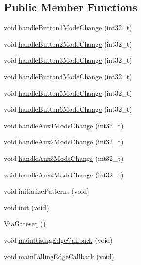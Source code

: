 \subsection*{Public Member Functions}
\begin{DoxyCompactItemize}
\item 
void \mbox{\hyperlink{class_via_gateseq_a7238ac41564eee6827e6a01032374a4f}{handle\+Button1\+Mode\+Change}} (int32\+\_\+t)
\item 
void \mbox{\hyperlink{class_via_gateseq_ab28f41fb2ac733e2e027164400bbe868}{handle\+Button2\+Mode\+Change}} (int32\+\_\+t)
\item 
void \mbox{\hyperlink{class_via_gateseq_a87d499976eda6b518b32b240692ee83b}{handle\+Button3\+Mode\+Change}} (int32\+\_\+t)
\item 
void \mbox{\hyperlink{class_via_gateseq_a4fd21cfbe89e9a610a4f1fed5a3a5209}{handle\+Button4\+Mode\+Change}} (int32\+\_\+t)
\item 
void \mbox{\hyperlink{class_via_gateseq_abe42605edbcd7826d040303dd4564eeb}{handle\+Button5\+Mode\+Change}} (int32\+\_\+t)
\item 
void \mbox{\hyperlink{class_via_gateseq_ace1960408caf61b994b099151c663580}{handle\+Button6\+Mode\+Change}} (int32\+\_\+t)
\item 
void \mbox{\hyperlink{class_via_gateseq_a1eb52cddac4eee6df5044e712ff679aa}{handle\+Aux1\+Mode\+Change}} (int32\+\_\+t)
\item 
void \mbox{\hyperlink{class_via_gateseq_a73ae14c3b94bf0440f823f81ee11fd95}{handle\+Aux2\+Mode\+Change}} (int32\+\_\+t)
\item 
void \mbox{\hyperlink{class_via_gateseq_a65dbb600b9d299c8e2792f9deee742b5}{handle\+Aux3\+Mode\+Change}} (int32\+\_\+t)
\item 
void \mbox{\hyperlink{class_via_gateseq_acf4b669d15e07c42bc7daca791d6a1b8}{handle\+Aux4\+Mode\+Change}} (int32\+\_\+t)
\item 
void \mbox{\hyperlink{class_via_gateseq_ae414221192a80f4f0923bd26d9255156}{initialize\+Patterns}} (void)
\item 
void \mbox{\hyperlink{class_via_gateseq_aff187d21f5f13cc6bd0a029aa6d6bb89}{init}} (void)
\item 
\mbox{\hyperlink{class_via_gateseq_ac0bb7455cf2081d645574d5274862591}{Via\+Gateseq}} ()
\item 
void \mbox{\hyperlink{class_via_gateseq_a4e1357b25c2c3c297e6d961840e1ff2e}{main\+Rising\+Edge\+Callback}} (void)
\item 
void \mbox{\hyperlink{class_via_gateseq_acc4340b313d59798c9bfd241af82997c}{main\+Falling\+Edge\+Callback}} (void)

\end{DoxyCompactItemize}

